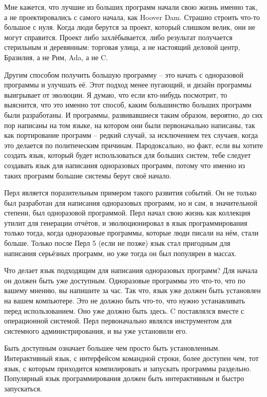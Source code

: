 \documentclass[ebook,12pt,oneside,openany]{memoir}
\begin{document}
Мне кажется, что лучшие из больших программ начали свою жизнь именно
так, а не проектировались с самого начала, как Hoover Dam. Страшно
строить что-то большое с нуля. Когда люди берутся за проект, который
слишком велик, они не могут справится. Проект либо захлёбывается, либо
результат получается стерильным и деревянным: торговая улица, а не
настоящий деловой центр, Бразилия, а не Рим, Ada, а не C.

Другим способом получить большую программу -- это начать с одноразовой
программы и улучшать её. Этот подход менее пугающий, и дизайн
программы выигрывает от эволюции. Я думаю, что если кто-нибудь
посмотрит, то выяснится, что это именно тот способ, каким большинство
больших программ были разработаны. И программы, развивавшиеся таким
образом, вероятно, до сих пор написаны на том языке, на котором они
были первоначально написаны, так как портирование программ -- редкий
случай, за исключением тех случаев, когда это делается по политическим
причинам. Пародоксально, но факт, если вы хотите создать язык, который
будет использоваться для больших систем, тебе следует создавать язык
для написания одноразовых программ, потому что именно из таких
программ большие системы берут своё начало.

Перл является поразительным примером такого развития событий. Он не
только был разработан для написания одноразовых программ, но и сам, в
значительной степени, был одноразовой программой. Перл начал свою
жизнь как коллекция утилит для генерации отчётов, и эволюционировал в
язык программирования только тогда, когда одноразовые программы,
которые люди писали на нём, стали больше. Только после Перл 5 (если не
позже) язык стал пригодным для написания серьёзных программ, но уже
тогда он был популярен в массах.

Что делает язык подходящим для написания одноразовых программ? Для
начала он должен быть уже доступным. Одноразовые программы это что-то,
что по вашему мнению, вы напишите за час. Так что, язык уже должен
быть установлен на вашем компьютере. Это не должно быть что-то, что
нужно устанавливать перед использованием. Оно уже должно быть здесь. C
поставлялся вместе с операционной системой. Перл первоначально являлся
инструментом для системного администрирования, и вы уже установили
его.

Быть доступным означает большее чем просто быть установленным.
Интерактивный язык, с интерфейсом командной строки, более доступен
чем, тот язык, с которым приходится компилировать и запускать
программы раздельно. Популярный язык программирования должен быть
интерактивным и быстро запускаться.
\end{document}
